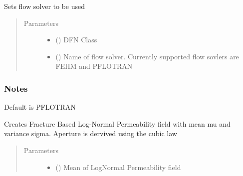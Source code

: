 \documentclass[letterpaper,10pt,english]{sphinxmanual}
\begin{document}
\begin{fulllineitems}
\begin{fulllineitems}
\label{\detokenize{pydfnworks:pydfnworks.general.dfnworks.DFNWORKS.set_flow_solver}}
Sets flow solver to be used
\begin{quote}\begin{description}
\item[{Parameters}] \leavevmode\begin{itemize}
\item {} 
 () \textendash{} DFN Class

\item {} 
 () \textendash{} Name of flow solver. Currently supported flow sovlers are FEHM and PFLOTRAN

\end{itemize}

\end{description}\end{quote}
\subsubsection*{Notes}

Default is PFLOTRAN

\end{fulllineitems}


\begin{fulllineitems}
\label{\detokenize{pydfnworks:pydfnworks.general.dfnworks.DFNWORKS.uncorrelated}}
Creates Fracture Based Log-Normal Permeability field with mean mu and variance sigma. Aperture is dervived using the cubic law
\begin{quote}\begin{description}
\item[{Parameters}] \leavevmode\begin{itemize}
\item {} 
 () \textendash{} Mean of LogNormal Permeability field


\end{itemize}
\end{description}
\end{quote}
\end{fulllineitems}
\end{fulllineitems}
\end{document}
